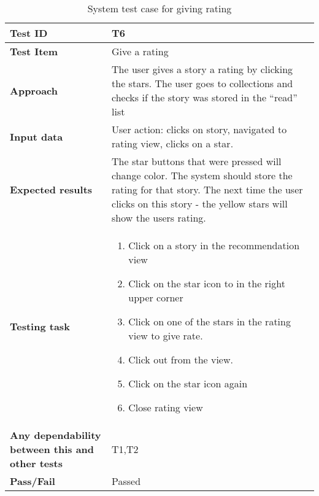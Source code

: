 \begin{center}
	\begin{table}[H]
		\begin{tabular}{ | p{4cm} | p{12cm}  |}
			\hline
			\textbf{Test ID} & T6  \\ \hline
			\textbf{Test Item} & Give a rating \\ \hline
			\textbf{Approach} & The user gives a story a rating by clicking the stars. The user goes to collections and checks if the story was stored in the “read” list \\ \hline
			\textbf{Input data} &  User action: clicks on story, navigated to rating view, clicks on a star. \\ \hline
			\textbf{Expected results} & The star buttons that were pressed will change color.  The system should store the rating for that story. The next time the user clicks on this story - the yellow stars will show the users rating.  \\ \hline
			\textbf{Testing task} & 
			\begin{enumerate}[noitemsep]
			\item Click on a story in the recommendation view
			\item Click on the star icon to in the right upper corner
			\item Click on one of the stars in the rating view to give rate.
			\item Click out from the view. 
			\item Click on the star icon again
			\item Close rating view
			\end{enumerate}
			\\ \hline
			\textbf{Any dependability between this and other tests} & T1,T2 \\ \hline		
			\textbf{Pass/Fail} & Passed \\\hline			
		\end{tabular}

	\caption{System test case for giving rating}
	\label{Tab_systemTesting6}
	\end{table}
\end{center}


